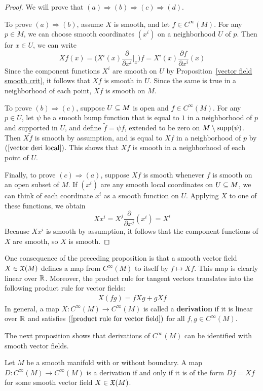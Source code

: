 \begin{proof}
We will prove that $(a)\Rightarrow(b)\Rightarrow(c)\Rightarrow(d)$.\par
To prove $(a)\Rightarrow(b)$, assume $X$ is smooth, and let $f\in C^\infty(M)$. For any $p\in M$, we can choose smooth coordinates $(x^i)$ on a neighborhood $U$ of $p$. Then for $x\in U$, we can write
\[Xf(x)=\Big(X^i(x)\frac{\partial}{\partial x^i}\Big|_x\Big)f=X^i(x)\frac{\partial f}{\partial x^i}(x)\]
Since the component functions $X^i$ are smooth on $U$ by Proposition~\ref{vector field smooth crit}, it follows that $Xf$ is smooth in $U$. Since the same is true in a neighborhood of each point, $Xf$ is smooth on $M$.\par
To prove $(b)\Rightarrow(c)$, suppose $U\subseteq M$ is open and $f\in C^\infty(M)$. For any $p\in U$, let $\psi$ be a smooth bump function that is equal to $1$ in a neighborhood of $p$ and supported in $U$, and define $\widetilde{f}=\psi f$, extended to be zero on $M\setminus\mathrm{supp}(\psi)$. Then $X\widetilde{f}$ is smooth by assumption, and is equal to $Xf$ in a neighborhood of $p$ by $(\ref{vector deri local})$. This shows that $Xf$ is smooth in a neighborhood of each point of $U$.\par
Finally, to prove $(c)\Rightarrow(a)$, suppose $Xf$ is smooth whenever $f$ is smooth on an open subset of $M$. If $(x^i)$ are any smooth local coordinates on $U\subseteq M$, we can think of each coordinate $x^i$ as a smooth function on $U$. Applying $X$ to one of these functions, we obtain
\[Xx^i=X^j\frac{\partial}{\partial x^j}(x^i)=X^i\]
Because $Xx^i$ is smooth by assumption, it follows that the component functions of $X$ are smooth, so $X$ is smooth.
\end{proof}
One consequence of the preceding proposition is that a smooth vector field $X\in\mathfrak{X}(M)$ defines a map from $C^\infty(M)$ to itself by $f\mapsto Xf$. This map is clearly linear over $\mathbb{R}$. Moreover, the product rule for tangent vectors translates into the following product rule for vector fields:
\begin{align}\label{product rule for vector field}
X(fg)=fXg+gXf
\end{align}
In general, a map $X:C^\infty(M)\to C^\infty(M)$ is called a \textbf{derivation} if it is linear over $\mathbb{R}$ and satisfies $(\ref{product rule for vector field})$ for all $f,g\in C^\infty(M)$.\par
The next proposition shows that derivations of $C^\infty(M)$ can be identified with smooth vector fields.
\begin{proposition}\label{derivative vector field}
Let $M$ be a smooth manifold with or without boundary. A map $D:C^\infty(M)\to C^\infty(M)$ is a derivation if and only if it is of the form $Df=Xf$ for some smooth vector field $X\in\mathfrak{X}(M)$.
\end{proposition}
